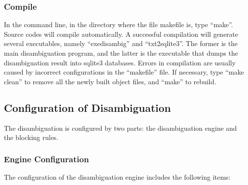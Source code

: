 \documentclass{article}
\begin{document}
\subsubsection{Compile}

In the command line, in the directory where the 
file makefile is, type “make”. 
Source codes will compile automatically. A successful 
compilation will generate several executables, namely
“exedisambig” and “txt2sqlite3”. 
The former is the main disambiguation program, and the 
latter is the executable that dumps the disambiguation 
result into sqlite3 databases. Errors in compilation are 
usually caused by incorrect configurations in 
the “makefile” file. If necessary, type 
“make clean” to remove all the newly built 
object files, and “make” to rebuild.


\subsection{Configuration of Disambiguation}

The disambiguation is configured by two parts: 
the disambiguation engine and the blocking rules.


\subsubsection{Engine Configuration}

The configuration of the disambiguation engine includes the following items:
\end{document}
